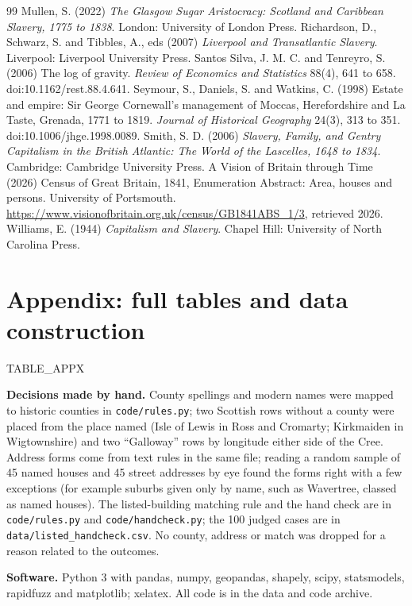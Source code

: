\documentclass[11pt,a4paper]{article}
\begin{document}
\begin{thebibliography}{99}
 Mullen, S. (2022) \textit{The Glasgow Sugar Aristocracy: Scotland and Caribbean Slavery, 1775 to 1838}. London: University of London Press.
 Richardson, D., Schwarz, S. and Tibbles, A., eds (2007) \textit{Liverpool and Transatlantic Slavery}. Liverpool: Liverpool University Press.
 Santos Silva, J. M. C. and Tenreyro, S. (2006) The log of gravity. \textit{Review of Economics and Statistics} 88(4), 641 to 658. doi:10.1162/rest.88.4.641.
 Seymour, S., Daniels, S. and Watkins, C. (1998) Estate and empire: Sir George Cornewall's management of Moccas, Herefordshire and La Taste, Grenada, 1771 to 1819. \textit{Journal of Historical Geography} 24(3), 313 to 351. doi:10.1006/jhge.1998.0089.
 Smith, S. D. (2006) \textit{Slavery, Family, and Gentry Capitalism in the British Atlantic: The World of the Lascelles, 1648 to 1834}. Cambridge: Cambridge University Press.
 A Vision of Britain through Time (2026) Census of Great Britain, 1841, Enumeration Abstract: Area, houses and persons. University of Portsmouth. \url{https://www.visionofbritain.org.uk/census/GB1841ABS_1/3}, retrieved 2026.
 Williams, E. (1944) \textit{Capitalism and Slavery}. Chapel Hill: University of North Carolina Press.
\end{thebibliography}

\appendix
\section{Appendix: full tables and data construction}
{{TABLE_APPX}}

\textbf{Decisions made by hand.} County spellings and modern names were mapped to historic counties in \texttt{code/rules.py}; two Scottish rows without a county were placed from the place named (Isle of Lewis in Ross and Cromarty; Kirkmaiden in Wigtownshire) and two ``Galloway'' rows by longitude either side of the Cree. Address forms come from text rules in the same file; reading a random sample of 45 named houses and 45 street addresses by eye found the forms right with a few exceptions (for example suburbs given only by name, such as Wavertree, classed as named houses). The listed-building matching rule and the hand check are in \texttt{code/rules.py} and \texttt{code/handcheck.py}; the 100 judged cases are in \texttt{data/listed\_handcheck.csv}. No county, address or match was dropped for a reason related to the outcomes.

\textbf{Software.} Python 3 with pandas, numpy, geopandas, shapely, scipy, statsmodels, rapidfuzz and matplotlib; xelatex. All code is in the data and code archive.
\end{document}
